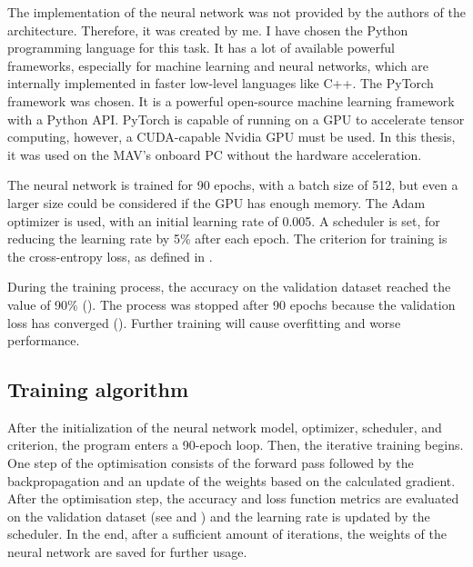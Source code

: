 The implementation of the neural network was not provided by the authors of the architecture. Therefore, it was created by me. I have chosen the Python programming language for this task. It has a lot of available powerful frameworks, especially for machine learning and neural networks, which are internally implemented in faster low-level languages like C++. The PyTorch framework was chosen. It is a powerful open-source machine learning framework with a Python \acs{API}. PyTorch is capable of running on a \acs{GPU} to accelerate tensor computing, however, a CUDA-capable Nvidia \acs{GPU} must be used. In this thesis, it was used on the \acs{MAV}'s onboard PC without the hardware acceleration.

The neural network is trained for 90 epochs, with a batch size of 512, but even a larger size could be considered if the GPU has enough memory. The Adam optimizer is used, with an initial learning rate of 0.005. A scheduler is set, for reducing the learning rate by 5\% after each epoch. The criterion for training is the cross-entropy loss, as defined in . 

During the training process, the accuracy on the validation dataset reached the value of 90\% (). The process was stopped after 90 epochs because the validation loss has converged (). Further training will cause overfitting and worse performance.

\subsection{Training algorithm}

After the initialization of the neural network model, optimizer, scheduler, and criterion, the program enters a 90-epoch loop. Then, the iterative training begins. One step of the optimisation consists of the forward pass followed by the backpropagation and an update of the weights based on the calculated gradient. After the optimisation step, the accuracy and loss function metrics are evaluated on the validation dataset (see  and ) and the learning rate is updated by the scheduler. In the end, after a sufficient amount of iterations, the weights of the neural network are saved for further usage.

